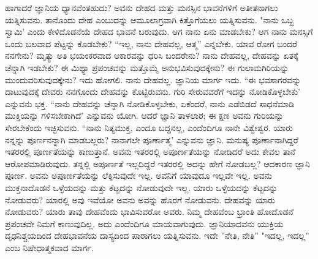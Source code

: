 ಹಾಗಾದರೆ ಜ್ಞಾನಿಯ ಧ್ಯಾನವೆಂತಹುದು? ಅವನು ದೇಹದ ಮತ್ತು ಮನಸ್ಸಿನ ಭಾವನೆಗಳಿಗೆ ಅತೀತನಾಗಲು ಯತ್ನಿಸುವನು. ತಾನೊಂದು ದೇಹ ಎಂಬುದನ್ನು ಆಮೂಲಾಗ್ರವಾಗಿ ಕಿತ್ತೊಗೆಯಲು ಯತ್ನಿಸುವನು. "ನಾನು ಒಬ್ಬ ಸ್ವಾಮಿ' ಎಂದು ಕೇಳಿದೊಡನೆಯೆ ದೇಹದ ಭಾವನೆ ಬರುವುದು. ಆಗ ನಾನು ಏನು ಮಾಡಬೇಕು? ಆಗ ನಾನು ಮನಸ್ಸಿಗೆ ಒಂದು ಬಲವಾದ ಪೆಟ್ಟನ್ನು ಕೊಡಬೇಕು? “ಇಲ್ಲ, ನಾನು ದೇಹವಲ್ಲ, ಆತ್ಮ'' ಎನ್ನಬೇಕು. ಯಾವ ರೋಗ ಬಂದರೆ ನನಗೇನು? ಮೃತ್ಯು ಅತಿ ಭಯಂಕರವಾದ ಆಕಾರವನ್ನು ಧರಿಸಿ ಬಂದರೇನು? ನಾನು ದೇಹವಲ್ಲ, ದೇಹವನ್ನು ಏತಕ್ಕೆ ಚೆನ್ನಾಗಿ ಇಡಬೇಕು? ಈ ಮಿಥ್ಯಾ ಪ್ರಪಂಚವನ್ನು ಮತ್ತೊಮ್ಮೆ ಅನುಭವಿಸುವುದಕ್ಕೇನು? ಈ ಗುಲಾಮಗಿರಿಯನ್ನು ಮುಂದುವರಿಸುವುದಕ್ಕೇನು? ಇದು ಹೋಗಲಿ. ನಾನು ದೇಹವಲ್ಲ. ಜ್ಞಾನಿಯ ಮಾರ್ಗ ಇದು. “ಈ ಭವಸಾಗರವನ್ನು ದಾಟುವುದಕ್ಕೆ ದೇವರು ನನಗೊಂದು ದೇಹವನ್ನು ಕೊಟ್ಟಿರುವನು. ಗುರಿ ಸೇರುವವರೆಗೆ ಇದನ್ನು ನೋಡಿಕೊಳ್ಳಬೇಕು' ಎನ್ನುವನು ಭಕ್ತ. “ನಾನು ದೇಹವನ್ನು ಚೆನ್ನಾಗಿ ನೋಡಿಕೊಳ್ಳಬೇಕು, ಏಕೆಂದರೆ, ನಾನು ಎಡೆಬಿಡದೆ ಸಾಧನೆಮಾಡಿ ಮುಕ್ತಿಯನ್ನು ಗಳಿಸಬೇಕಾಗಿದೆ' ಎನ್ನುವನು ಯೋಗಿ. ಆದರೆ ಜ್ಞಾನಿ ತಾಳಲಾರ; ಈ ಕ್ಷಣ ಅವನು ಗುರಿಯನ್ನು ಸೇರಬೇಕೆಂದು ಇಚ್ಛಿಸುವನು. “ನಾನು ನಿತ್ಯಮುಕ್ತ, ಎಂದೂ ಬದ್ದನಲ್ಲ, ಎಂದೆಂದಿಗೂ ನಾನೇ ವಿಶ್ವೇಶ್ವರ. ಯಾರು ನನ್ನನ್ನು ಪೂರ್ಣನನ್ನಾಗಿ ಮಾಡಬಲ್ಲರು? ನಾನಾಗಲೇ ಪೂರ್ಣಾತ್ಮ' ಎನ್ನುವನು ಜ್ಞಾನಿ. ಮನುಷ್ಯ ಪೂರ್ಣಾನಾಗಿದ್ದರೆ ಇತರರಲ್ಲಿ ಪೂರ್ಣತೆಯನ್ನು ಕಾಣುತ್ತಾನೆ. ಅವನು ಇತರರಲ್ಲಿ ಅಪೂರ್ಣತೆಯನ್ನು ನೋಡಿದರೆ ಅದು ಕೇವಲ ತಾನೆ ಆರೋಪಮಾಡಿರುವುದು. ತನ್ನಲ್ಲಿ ಅಪೂರ್ಣತೆ ಇಲ್ಲದಿದ್ದರೆ ಇತರರಲ್ಲಿ ಅದನ್ನು ಹೇಗೆ ನೋಡಬಲ್ಲ? ಆದಕಾರಣ ಜ್ಞಾನಿ ಪೂರ್ಣ. ಅವನು ಅಪೂರ್ಣತೆಯನ್ನು ಲೆಕ್ಕಿಸುವುದೇ ಇಲ್ಲ. ಅವನಿಗೆ ಯಾವುದೂ ಇಲ್ಲವೇ ಇಲ್ಲ. ಅವನು ಮುಕ್ತನಾದೊಡನೆ ಒಳ್ಳೆಯದನ್ನು ಮತ್ತು ಕೆಟ್ಟದನ್ನು ನೋಡುವುದೇ ಇಲ್ಲ. ಯಾರು ಒಳ್ಳೆಯದನ್ನು ಕೆಟ್ಟದನ್ನು ನೋಡುವರು? ಯಾರಲ್ಲಿ ಅವು ಇವೆಯೋ ಅವನು ಅವನ್ನು ಹೊರಗೆ ನೋಡುವನು. ದೇಹವನ್ನು ಯಾರು ನೋಡುವರು? ಯಾರು ತಾವು ದೇಹವೆಂದು ಭಾವಿಸುವರೋ ಅವರು. ನಿಮ್ಮ ದೇಹವೆಂಬ ಭ್ರಾಂತಿ ಹೋದೊಡನೆ ಪ್ರಪಂಚವೇ ನಿಮಗೆ ಕಾಣುವುದಿಲ್ಲ. ಅದು ಎಂದೆಂದಿಗೂ ಮಾಯವಾಗುವುದು. ಜ್ಞಾನಿಯಾದವನು ಯುಕ್ತಿಯ ದೃಢನಿಶ್ಚಯದಿಂದ ದೇಹಭಾವನೆಯ ದಾಸ್ಯದಿಂದ ಪಾರಾಗಲು ಯತ್ನಿಸುವನು. ಇದೇ ''ನೇತಿ, ನೇತಿ'' "ಇದಲ್ಲ, ಇದಲ್ಲ'' ಎಂಬ ನಿಷೇಧಾತ್ಮಕವಾದ ಮಾರ್ಗ.

